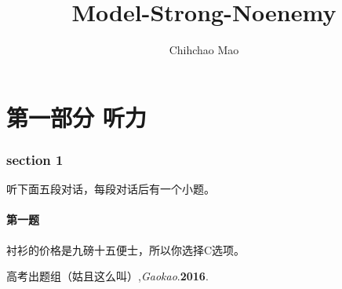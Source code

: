 \documentclass[a4paper 14pt]{article}
\title{\sanhao \SH Model-Strong-Noenemy}
\author{Chihchao Mao}
\date{}%
\newcommand{\xiaosihao}{\fontsize{12pt}{\baselineskip}\selectfont}  %
\numberwithin{figure}{section} %
\numberwithin{table}{section} %
\begin{document}
	\maketitle
	
	\tableofcontents%
	
	\clearpage
	
	
	\xiaosihao%
	

\part{第一部分 听力\cite{foo1}}
\section{section 1}
听下面五段对话，每段对话后有一个小题。\\
\subsection{第一题}
衬衫的价格是九磅十五便士，所以你选择C选项。



\newpage
\begin{thebibliography}{9}
	高考出题组（姑且这么叫）,\emph{Gaokao}.\textbf{2016}.
\end{thebibliography}
	
\end{document}
